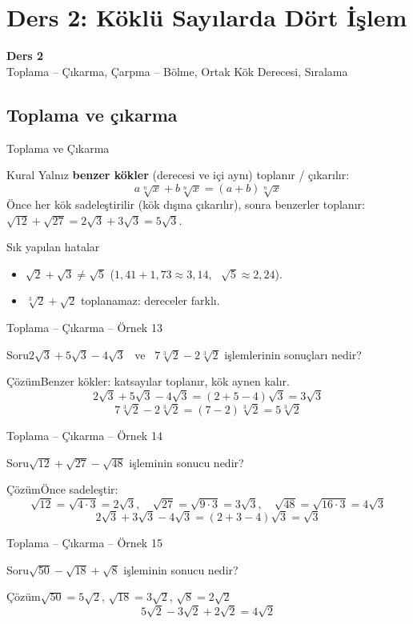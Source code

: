 \documentclass[aspectratio=169,11pt,handout]{beamer}
\newcommand{\soru}[3]{%
\begin{frame}{#1}
  \begin{block}{Soru}\large #2\end{block}
  \pause
  \begin{exampleblock}{Çözüm}\large #3\end{exampleblock}
\end{frame}}
\begin{document}
\section{Ders 2: Köklü Sayılarda Dört İşlem}
\begin{frame}
\centering\Large\color{anamavi}\textbf{Ders 2}\\[6pt]\normalsize Toplama -- Çıkarma, Çarpma -- Bölme, Ortak Kök Derecesi, Sıralama
\end{frame}

\subsection{Toplama ve çıkarma}
\begin{frame}{Toplama ve Çıkarma}
\begin{block}{Kural}
Yalnız \textbf{benzer kökler} (derecesi ve içi aynı) toplanır / çıkarılır:
\[a\sqrt[n]{x}+b\sqrt[n]{x}=(a+b)\sqrt[n]{x}\]
Önce her kök sadeleştirilir (kök dışına çıkarılır), sonra benzerler toplanır:
\ \(\sqrt{12}+\sqrt{27}=2\sqrt3+3\sqrt3=5\sqrt3\).
\end{block}
\begin{alertblock}{Sık yapılan hatalar}
\begin{itemize}
\item \(\sqrt2+\sqrt3\neq\sqrt5\) \quad (\(1{,}41+1{,}73\approx 3{,}14\), \ \(\sqrt5\approx 2{,}24\)).
\item \(\sqrt[3]{2}+\sqrt2\) toplanamaz: dereceler farklı.
\end{itemize}
\end{alertblock}
\end{frame}

\soru{Toplama -- Çıkarma -- Örnek 13}
{\(2\sqrt3+5\sqrt3-4\sqrt3\) \ ve \ \(7\sqrt[3]{2}-2\sqrt[3]{2}\) işlemlerinin sonuçları nedir?}
{Benzer kökler: katsayılar toplanır, kök aynen kalır.
\[2\sqrt3+5\sqrt3-4\sqrt3=(2+5-4)\sqrt3=3\sqrt3\]
\[7\sqrt[3]{2}-2\sqrt[3]{2}=(7-2)\sqrt[3]{2}=5\sqrt[3]{2}\]}

\soru{Toplama -- Çıkarma -- Örnek 14}
{\(\sqrt{12}+\sqrt{27}-\sqrt{48}\) işleminin sonucu nedir?}
{Önce sadeleştir:
\[\sqrt{12}=\sqrt{4\cdot 3}=2\sqrt3,\quad \sqrt{27}=\sqrt{9\cdot 3}=3\sqrt3,\quad \sqrt{48}=\sqrt{16\cdot 3}=4\sqrt3\]
\[2\sqrt3+3\sqrt3-4\sqrt3=(2+3-4)\sqrt3=\sqrt3\]}

\soru{Toplama -- Çıkarma -- Örnek 15}
{\(\sqrt{50}-\sqrt{18}+\sqrt8\) işleminin sonucu nedir?}
{\(\sqrt{50}=5\sqrt2\), \quad \(\sqrt{18}=3\sqrt2\), \quad \(\sqrt8=2\sqrt2\)
\[5\sqrt2-3\sqrt2+2\sqrt2=4\sqrt2\]}
\end{document}
